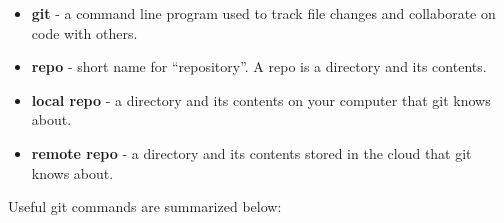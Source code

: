 \documentclass{book}
\providecommand{\tightlist}{%
      \setlength{\itemsep}{0pt}\setlength{\parskip}{0pt}}
\begin{document}
\begin{itemize}
\tightlist
\item
  \textbf{git} - a command line program used to track file changes and
  collaborate on code with others.
\item
  \textbf{repo} - short name for ``repository''. A repo is a directory
  and its contents.
\item
  \textbf{local repo} - a directory and its contents on your computer
  that git knows about.
\item
  \textbf{remote repo} - a directory and its contents stored in the
  cloud that git knows about.
\end{itemize}
    




    
        Useful git commands are summarized below:
\end{document}
